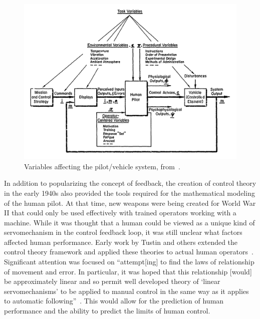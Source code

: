 \begin{figure}[!b]
    \begin{center}
        \includegraphics[width=0.8\linewidth]{figures/Introduction/Screen_Shot_2018-07-25_at_10_37_08_AM.png}
        \caption[Variables affecting the pilot/vehicle system]{Variables affecting the pilot/vehicle system, from~\citet{mcruer_mathematical_1974}.}
        \label{figure:mcruer1974}
    \end{center}
\end{figure}

In addition to popularizing the concept of feedback, the creation of control theory in the early 1940s also provided the tools required for the mathematical modeling of the human pilot.
At that time, new weapons were being created for World War II that could only be used effectively with trained operators working with a machine.
While it was thought that a human could be viewed as a unique kind of servomechanism in the control feedback loop, it was still unclear what factors affected human performance.
Early work by Tustin and others extended the control theory framework and applied these theories to actual human operators~\citep{tustin1944investigation}.
Significant attention was focused on ``attempt[ing] to find the laws of relationship of movement and error.
In particular, it was hoped that this relationship [would] be approximately linear and so permit well developed theory of `linear servomechanisms' to be applied to manual control in the same way as it applies to automatic following''~\citep{tustin1944investigation}.
This would allow for the prediction of human performance and the ability to predict the limits of human control.

